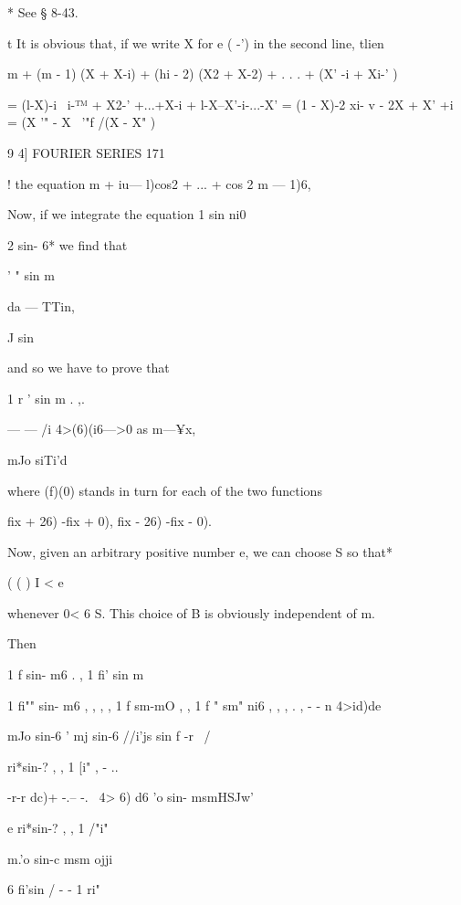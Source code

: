 * See § 8-43.

t It is obvious that, if we write X for e ( -') in the second line,
tlien

m + (m - 1) (X + X-i) + (hi - 2) (X2 + X-2) + . . . + (X' -i + Xi-' )

= (l-X)-i \ i-™ + X2-' +...+X-i + l-X--X'-i-...-X' = (1 - X)-2 xi- v -
2X + X' +i = (X '" - X~ '"f /(X - X" )



9 4] FOURIER SERIES 171

! the equation m + iu— l)cos2 + ... + cos 2 m — 1)6,



Now, if we integrate the equation 1 sin ni0



2 sin- 6* we find that



' " sin m

da — TTin,



J sin

and so we have to prove that

1 r ' sin m . ,.

— — /i 4>(6)(i6—>0 as m—¥x,

mJo siTi'd

where (f)(0) stands in turn for each of the two functions

fix + 26) -fix + 0), fix - 26) -fix - 0).

Now, given an arbitrary positive number e, we can choose S so that*

( ( ) I < e

whenever 0< 6 S. This choice of B is obviously independent of m.

Then

1 f sin- m6 . , 1 fi' sin m



1 fi"" sin- m6 , , , , 1 f sm-mO , , 1 f " sm" ni6 , , , . , - - n
4>id)de %

mJo sin-6 ' mj sin-6 //i'js sin f -r \ /

ri*sin-? , , 1 [i" , - ..

-r-r dc)+ -.-- -. \ 4> 6) d6 'o sin- msmHSJw'



e ri*sin-? , , 1 /"i"

m.'o sin-c msm ojji

6 fi'sin / - - 1 ri"



